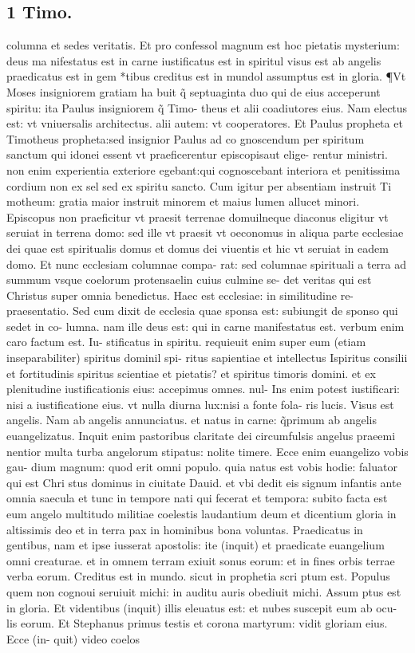 \documentclass{article}
\begin{document}
\begin{pages}
\section*{1 Timo. }
\marginpar{[ p.206 ]}\pstart columna et sedes veritatis. Et pro confessol magnum est hoc pietatis mysterium: deus ma nifestatus est in carne iustificatus est in spiritul visus est ab angelis praedicatus est in gem *tibus creditus est in mundol assumptus est in gloria. ¶Vt Moses insigniorem gratiam ha buit q̃ septuaginta duo qui de eius acceperunt spiritu: ita Paulus insigniorem q̃ Timo- theus et alii coadiutores eius. Nam electus est: vt vniuersalis architectus. alii autem: vt cooperatores. Et Paulus propheta et Timotheus propheta:sed insignior Paulus ad co gnoscendum per spiritum sanctum qui idonei essent vt praeficerentur episcopisaut elige- rentur ministri. non enim experientia exteriore egebant:qui cognoscebant interiora et penitissima cordium non ex sel sed ex spiritu sancto. Cum igitur per absentiam instruit Ti motheum: gratia maior instruit minorem et maius lumen allucet minori. Episcopus non praeficitur vt praesit terrenae domuilneque diaconus eligitur vt seruiat in terrena domo: sed ille vt praesit vt oeconomus in aliqua parte ecclesiae dei quae est spiritualis domus et domus dei viuentis et hic vt seruiat in eadem domo. Et nunc ecclesiam columnae compa- rat: sed columnae spirituali a terra ad summum vsque coelorum protensaelin cuius culmine se- det veritas qui est Christus super omnia benedictus. Haec est ecclesiae: in similitudine re- praesentatio. Sed cum dixit de ecclesia quae sponsa est: subiungit de sponso qui sedet in co- lumna. nam ille deus est: qui in carne manifestatus est. verbum enim caro factum est. Iu- stificatus in spiritu. requieuit enim super eum (etiam inseparabiliter) spiritus dominil spi- ritus sapientiae et intellectus Ispiritus consilii et fortitudinis spiritus scientiae et pietatis? et spiritus timoris domini. et ex plenitudine iustificationis eius: accepimus omnes. nul- Ins enim potest iustificari: nisi a iustificatione eius. vt nulla diurna lux:nisi a fonte fola- ris lucis. Visus est angelis. Nam ab angelis annunciatus. et natus in carne: q̃primum ab angelis euangelizatus. Inquit enim pastoribus claritate dei circumfulsis angelus praeemi nentior multa turba angelorum stipatus: nolite timere. Ecce enim euangelizo vobis gau- dium magnum: quod erit omni populo. quia natus est vobis hodie: faluator qui est Chri stus dominus in ciuitate Dauid. et vbi dedit eis signum infantis ante omnia saecula et tunc in tempore nati qui fecerat et tempora: subito facta est eum angelo multitudo militiae coelestis laudantium deum et dicentium gloria in altissimis deo et in terra pax  in hominibus bona voluntas. Praedicatus in gentibus, nam et ipse iusserat apostolis: ite (inquit) et praedicate euangelium omni creaturae. et in omnem terram exiuit sonus eorum: et in fines orbis terrae verba eorum. Creditus est in mundo. sicut in prophetia scri ptum est. Populus quem non cognoui seruiuit michi: in auditu auris obediuit michi. Assum ptus est in gloria. Et videntibus (inquit) illis eleuatus est: et nubes suscepit eum ab ocu- lis eorum. Et Stephanus primus testis et corona martyrum: vidit gloriam eius. Ecce (in- quit) video coelos 
\end{pages}
\end{document}
